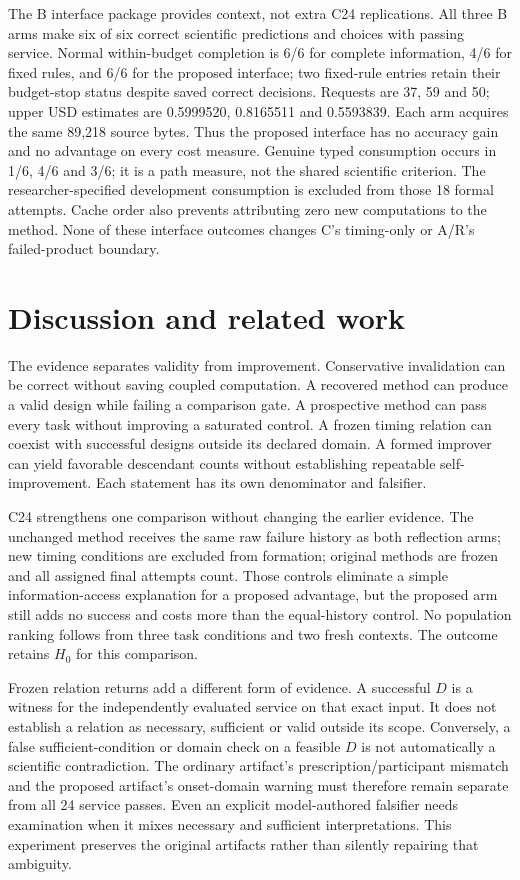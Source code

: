 The B interface package provides context, not extra C24 replications. All
three B arms make six of six correct scientific predictions and choices with
passing service. Normal within-budget completion is 6/6 for complete information,
4/6 for fixed rules, and 6/6 for the proposed interface; two fixed-rule entries
retain their budget-stop status despite saved correct decisions. Requests are
37, 59 and 50; upper USD estimates are 0.5999520, 0.8165511 and 0.5593839.
Each arm acquires the same 89,218 source bytes. Thus the proposed interface
has no accuracy gain and no advantage on every cost measure. Genuine typed
consumption occurs in 1/6, 4/6 and 3/6; it is a path measure, not the shared
scientific criterion. The researcher-specified development consumption is
excluded from those 18 formal attempts. Cache order also prevents attributing
zero new computations to the method. None of these interface outcomes changes
C's timing-only or A/R's failed-product boundary.

\section{Discussion and related work}
The evidence separates validity from improvement. Conservative invalidation can
be correct without saving coupled computation. A recovered method can produce
a valid design while failing a comparison gate. A prospective method can pass
every task without improving a saturated control. A frozen timing relation can
coexist with successful designs outside its declared domain. A formed improver
can yield favorable descendant counts without establishing repeatable
self-improvement. Each statement has its own denominator and falsifier.

C24 strengthens one comparison without changing the earlier evidence. The
unchanged method receives the same raw failure history as both reflection arms;
new timing conditions are excluded from formation; original methods are frozen
and all assigned final attempts count. Those controls eliminate a simple
information-access explanation for a proposed advantage, but the proposed arm
still adds no success and costs more than the equal-history control. No
population ranking follows from three task conditions and two fresh contexts.
The outcome retains $H_0$ for this comparison.

Frozen relation returns add a different form of evidence. A successful $D$ is
a witness for the independently evaluated service on that exact input.
It does not establish a relation as necessary, sufficient or valid outside its
scope. Conversely, a false sufficient-condition or domain check on a feasible
$D$ is not automatically a scientific contradiction. The ordinary artifact's
prescription/participant mismatch and the proposed artifact's onset-domain
warning must therefore remain separate from all 24 service passes. Even an
explicit model-authored falsifier needs examination when it mixes necessary and
sufficient interpretations. This experiment preserves the original artifacts
rather than silently repairing that ambiguity.

